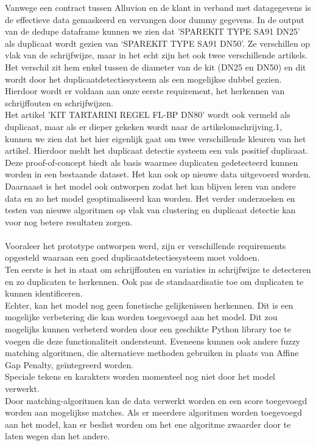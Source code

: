 Vanwege een contract tussen Alluvion en de klant in verband met datagegevens is de effectieve data gemaskeerd en vervangen door dummy gegevens. In de output van de dedupe dataframe kunnen we zien dat 'SPAREKIT TYPE SA91 DN25' als duplicaat wordt gezien van ‘SPAREKIT TYPE SA91 DN50’. Ze verschillen op vlak van de schrijfwijze, maar in het echt zijn het ook twee verschillende artikels. Het verschil zit hem enkel tussen de diameter van de kit (DN25 en DN50) en dit wordt door het duplicaatdetectiesysteem als een mogelijkse dubbel gezien. Hierdoor wordt er voldaan aan onze eerste requirement, het herkennen van schrijffouten en schrijfwijzen. 
\\Het artikel 'KIT TARTARINI REGEL FL-BP DN80' wordt ook vermeld als duplicaat, maar als er dieper gekeken wordt naar de artikelomschrijving.1, kunnen we zien dat het hier eigenlijk gaat om twee verschillende kleuren van het artikel. Hierdoor meldt het duplicaat detectie systeem een vals positief duplicaat. 
\\Deze proof-of-concept biedt als basis waarmee duplicaten gedetecteerd kunnen worden in een bestaande dataset. Het kan ook op nieuwe data uitgevoerd worden. Daarnaast is het model ook ontworpen zodat het kan blijven leren van andere data en zo het model geoptimaliseerd kan worden. Het verder onderzoeken en testen van nieuwe algoritmen op vlak van clustering en duplicaat detectie kan voor nog betere resultaten zorgen. 
\\ \\Vooraleer het prototype ontworpen werd, zijn er verschillende requirements opgesteld waaraan een goed duplicaatdetectiesysteem moet voldoen.
\\Ten eerste is het in staat om schrijffouten en variaties in schrijfwijze te detecteren en zo duplicaten te herkennen. Ook pas de standaardisatie toe om duplicaten te kunnen identificeren.
\\Echter, kan het model nog geen fonetische gelijkenissen herkennen. Dit is een mogelijke verbetering die kan worden toegevoegd aan het model. Dit zou mogelijks kunnen verbeterd worden door een geschikte Python library toe te voegen die deze functionaliteit ondersteunt. Eveneens kunnen ook andere fuzzy matching algoritmen, die alternatieve methoden gebruiken in plaats van Affine Gap Penalty, geïntegreerd worden.
\\Speciale tekens en karakters worden momenteel nog niet door het model verwerkt.
\\Door matching-algoritmen kan de data verwerkt worden en een score toegevoegd worden aan mogelijkse matches. Als er meerdere algoritmen worden toegevoegd aan het model, kan er beslist worden om het ene algoritme zwaarder door te laten wegen dan het andere. 